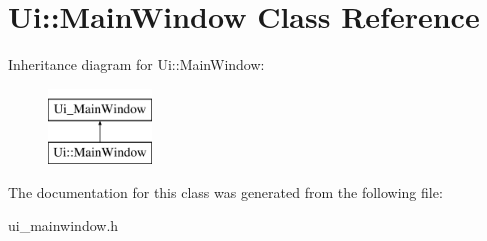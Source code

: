 \hypertarget{classUi_1_1MainWindow}{
\section{Ui::MainWindow Class Reference}
\label{classUi_1_1MainWindow}
}
Inheritance diagram for Ui::MainWindow:\begin{figure}[H]
\begin{center}
\leavevmode
\includegraphics[height=2.000000cm]{classUi_1_1MainWindow}
\end{center}
\end{figure}


The documentation for this class was generated from the following file:\begin{DoxyCompactItemize}
\item 
ui\_\-mainwindow.h\end{DoxyCompactItemize}
